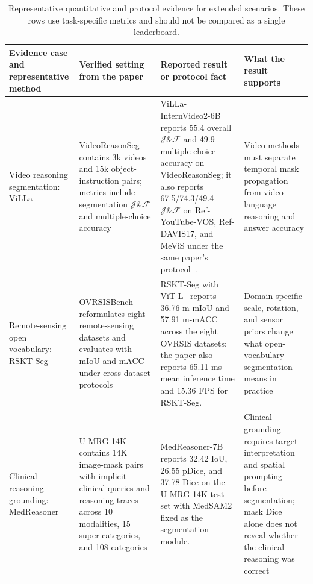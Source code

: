 \begin{table}[t]
\centering
\small
\setlength{\tabcolsep}{4pt}
\renewcommand{\arraystretch}{1.24}
\caption{Representative quantitative and protocol evidence for extended scenarios. These rows use task-specific metrics and should not be compared as a single leaderboard.}
\label{tab:extended-comparison-evidence}
\begin{tabularx}{\textwidth}{>{\raggedright\arraybackslash}p{}>{\raggedright\arraybackslash}p{}>{\raggedright\arraybackslash}p{}>{\raggedright\arraybackslash}X}
\toprule
Evidence case and representative method & Verified setting from the paper & Reported result or protocol fact & What the result supports \\
\midrule
Video reasoning segmentation: ViLLa~\citep{zhengVillaVideoReasoning2025} & VideoReasonSeg~\citep{zhengVillaVideoReasoning2025} contains 3k videos and 15k object-instruction pairs; metrics include segmentation $\mathcal{J}\&\mathcal{F}$ and multiple-choice accuracy & ViLLa-InternVideo2-6B~\citep{zhengVillaVideoReasoning2025} reports 55.4 overall $\mathcal{J}\&\mathcal{F}$ and 49.9 multiple-choice accuracy on VideoReasonSeg; it also reports 67.5/74.3/49.4 $\mathcal{J}\&\mathcal{F}$ on Ref-YouTube-VOS, Ref-DAVIS17, and MeViS under the same paper's protocol~\citep{zhengVillaVideoReasoning2025}. & Video methods must separate temporal mask propagation from video-language reasoning and answer accuracy \\
Remote-sensing open vocabulary: RSKT-Seg~\citep{libExploringEfficientOpenvocabulary2026} & OVRSISBench~\citep{libExploringEfficientOpenvocabulary2026} reformulates eight remote-sensing datasets and evaluates with mIoU and mACC under cross-dataset protocols & RSKT-Seg with ViT-L~\citep{libExploringEfficientOpenvocabulary2026} reports 36.76 m-mIoU and 57.91 m-mACC across the eight OVRSIS datasets; the paper also reports 65.11 ms mean inference time and 15.36 FPS for RSKT-Seg. & Domain-specific scale, rotation, and sensor priors change what open-vocabulary segmentation means in practice \\
Clinical reasoning grounding: MedReasoner~\citep{yanMedreasonerReinforcementLearning2026} & U-MRG-14K~\citep{yanMedreasonerReinforcementLearning2026} contains 14K image-mask pairs with implicit clinical queries and reasoning traces across 10 modalities, 15 super-categories, and 108 categories & MedReasoner-7B~\citep{yanMedreasonerReinforcementLearning2026} reports 32.42 IoU, 26.55 pDice, and 37.78 Dice on the U-MRG-14K test set with MedSAM2 fixed as the segmentation module. & Clinical grounding requires target interpretation and spatial prompting before segmentation; mask Dice alone does not reveal whether the clinical reasoning was correct \\

\end{tabularx}
\end{table}

